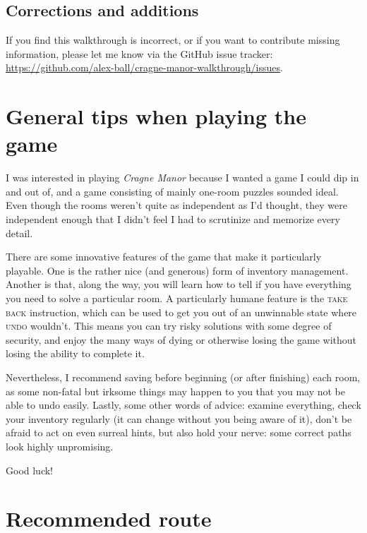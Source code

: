 \documentclass[a5paper]{extarticle}
\begin{document}
\bigskip
\subsection{Corrections and additions}

If you find this walkthrough is incorrect, or if you want to contribute
missing information, please let me know via the GitHub issue tracker:
\url{https://github.com/alex-ball/cragne-manor-walkthrough/issues}.

\newpage
\section{General tips when playing the game}

I was interested in playing \emph{Cragne Manor} because I wanted a game I could dip in and out of,
and a game consisting of mainly one-room puzzles sounded ideal.
Even though the rooms weren't quite as independent as I'd thought,
they were independent enough that I didn't feel I had to scrutinize and memorize every detail.

There are some innovative features of the game that make it particularly playable.
One is the rather nice (and generous) form of inventory management.
Another is that, along the way, you will learn how to tell if you have everything you need to solve a particular room.
A particularly humane feature is the \textsc{take back} instruction,
which can be used to get you out of an unwinnable state where \textsc{undo} wouldn't.
This means you can try risky solutions with some degree of security,
and enjoy the many ways of dying or otherwise losing the game
without losing the ability to complete it.

Nevertheless, I recommend saving before beginning (or after finishing) each room,
as some non-fatal but irksome things may happen to you that you may not be able to undo easily.
Lastly, some other words of advice: examine everything, check your inventory regularly
(it can change without you being aware of it), don't be afraid to act on even surreal hints,
but also hold your nerve: some correct paths look highly unpromising.

Good luck!

\newpage
\section{Recommended route}\label{sec:route}
\end{document}
